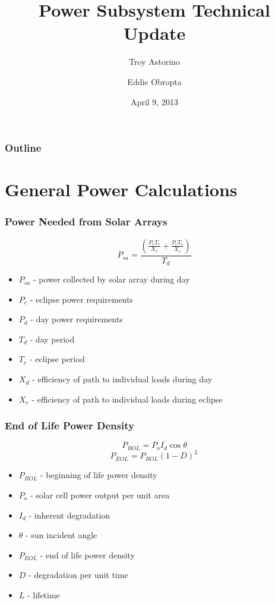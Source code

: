 \documentclass{beamer}
\title{Power Subsystem Technical Update}
\author{Troy Astorino \and Eddie Obropta}
\date{April 9, 2013}
\institute[16.83 -- MIT]{Space Systems Design \\ Massachusetts Institute of
  Technology}
\begin{document}
\begin{frame}
\maketitle
\end{frame}

\begin{frame}
  \frametitle{Outline}
  \tableofcontents
\end{frame}

\section{General Power Calculations}
\begin{frame}
  \frametitle{Power Needed from Solar Arrays}
  \[P_{sa} = \frac{\left(\frac{P_e T_e}{X_e} + \frac{P_e
        T_e}{X_e}\right)}{T_d}\]

  \begin{itemize}
    \item $P_{sa}$ - power collected by solar array during day
    \item $P_e$ - eclipse power requirements
    \item $P_d$ - day power requirements
    \item $T_d$ - day period
    \item $T_e$ - eclipse period
    \item $X_d$ - efficiency of path to individual loads during day
    \item $X_e$ - efficiency of path to individual loads during eclipse
  \end{itemize}
\end{frame}

\begin{frame}
  \frametitle{End of Life Power Density}
  \[P_{BOL} = P_o I_d \cos{\theta}\]
  \[P_{EOL} = P_{BOL} (1 - D)^L\]

  \begin{itemize}
    \item $P_{BOL}$ - beginning of life power density
    \item $P_o$ - solar cell power output per unit area
    \item $I_d$ - inherent degradation
    \item $\theta$ - sun incident angle
    \item $P_{EOL}$ - end of life power density
    \item $D$ - degradation per unit time
    \item $L$ - lifetime
  \end{itemize}
\end{frame}
\end{document}
